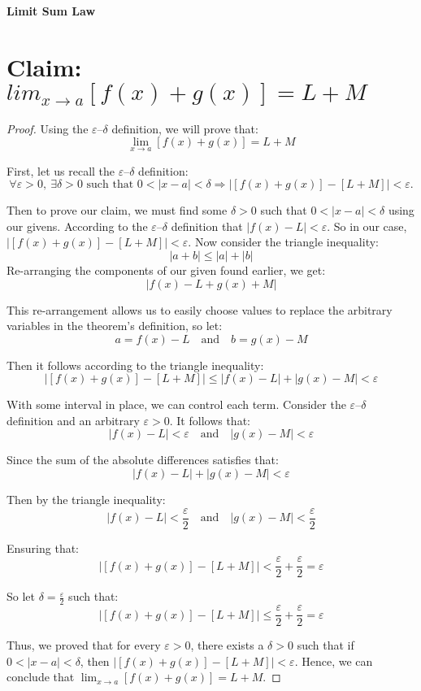 \documentclass{article}
\begin{document}
	
\textbf{Limit Sum Law}
\section*{Claim: $lim_{x \to a} [f(x) + g(x)] = L + M$}

\begin{proof}

Using the $\varepsilon$–$\delta$ definition, we will prove that: 
\[
\lim_{x \to a} [f(x) + g(x)] = L + M
\]

First, let us recall the $\varepsilon$–$\delta$ definition:
\[
\forall \varepsilon > 0, \ \exists \delta > 0 \text{ such that } 0 < |x - a| < \delta \Rightarrow \left| [f(x) + g(x)] - [L + M] \right| < \varepsilon.
\]

Then to prove our claim, we must find some $\delta > 0$ such that $0 < |x - a| < \delta$ using our givens. According to the $\varepsilon$–$\delta$ definition that $\left|f(x) - L\right| < \varepsilon$. So in our case, $\left|[f(x) + g(x)] - [L + M]\right| < \varepsilon$.
Now consider the triangle inequality:
\[
|a + b| \leq |a| + |b|
\]
Re-arranging the components of our given found earlier, we get:
\[
\left| f(x) - L + g(x) + M \right|
\]


This re-arrangement allows us to easily choose values to replace the arbitrary variables in the theorem's definition, so let:
\[
a = f(x) - L \quad \text{and} \quad b = g(x) - M
\]


Then it follows according to the triangle inequality:
\[
\left| [f(x) + g(x)] - [L + M] \right| \leq |f(x) - L| + |g(x) - M| < \varepsilon
\]


With some interval in place, we can control each term.
Consider the $\varepsilon$–$\delta$ definition and an arbitrary $\varepsilon > 0$. It follows that: 
\[
|f(x) - L| < \varepsilon \quad \text{and} \quad |g(x) - M| < \varepsilon
\]


Since the sum of the absolute differences satisfies that:
\[
|f(x) - L| + |g(x) - M| < \varepsilon
\]


Then by the triangle inequality:
\[
|f(x) - L| < \frac{\varepsilon}{2} \quad \text{and} \quad |g(x) - M| < \frac{\varepsilon}{2}
\]


Ensuring that:
\[
\left| [f(x) + g(x)] - [L + M] \right| < \frac{\varepsilon}{2} + \frac{\varepsilon}{2} = \varepsilon
\]


So let $\delta = \frac{\varepsilon}{2}$ such that:
\[
\left| [f(x) + g(x)] - [L + M] \right| \leq \frac{\varepsilon}{2} + \frac{\varepsilon}{2} = \varepsilon
\]

Thus, we proved that for every $\varepsilon > 0$, there exists a $\delta > 0$ such that if $0 < |x - a| < \delta$, then $\left| [f(x) + g(x)] - [L + M] \right| < \varepsilon$.
Hence, we can conclude that $\lim_{x \to a} [f(x) + g(x)] = L + M$.

\end{proof}
\end{document}
